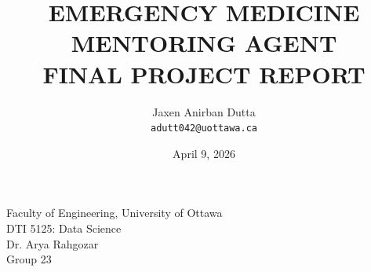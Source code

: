 \documentclass[11pt]{article}
\title{EMERGENCY MEDICINE MENTORING AGENT\\
\large FINAL PROJECT REPORT}
\author{
    Jaxen Anirban Dutta \\ \texttt{adutt042@uottawa.ca}
}
\date{April 9, 2026}
\begin{document}
\maketitle

\begin{center}
    Faculty of Engineering, University of Ottawa \\
    DTI 5125: Data Science \\
    Dr. Arya Rahgozar \\
    Group 23
\end{center}

\vspace{2em}















\end{document}

